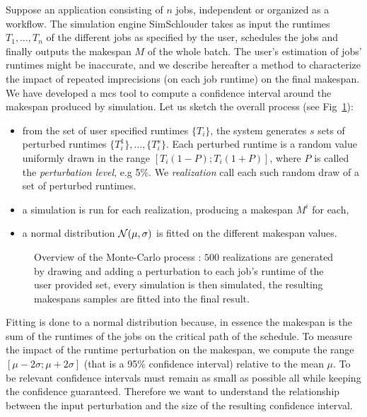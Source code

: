 \documentclass[10pt,conference,compsocconf]{IEEEtran}
\begin{document}
Suppose an  application consisting of  $n$ jobs,  independent or organized  as a
workflow.   The  simulation engine  SimSchlouder  takes  as input  the  runtimes
$T_1, \ldots ,  T_n$ of the different  jobs as specified by  the user, schedules
the jobs and  finally outputs the makespan  $M$ of the whole  batch.  The user's
estimation of  jobs' runtimes might be  inaccurate, and we describe  hereafter a
method to characterize the impact of repeated imprecisions (on each job runtime)
on the  final makespan.  We  have developed a \ac{mcs}  tool to compute a
confidence interval around the makespan produced   by   simulation.   Let   us
sketch   the   overall   process   (see Fig~\ref{fig:mc-process}):
\begin{itemize} 
\item from  the set of user  specified runtimes $\{T_i\}$, the  system generates
  $s$ sets of perturbed runtimes  $\{T_i^1\}, \ldots, \{T_i^s\}$. Each perturbed
  runtime    is   a    random   value    uniformly   drawn    in   the    range
  $[T_i (1-P); T_i  (1+P)]$, where $P$ is called  the \emph{perturbation level},
  e.g  5\%.  We \emph{realization}  call  each  such random  draw  of  a set  of
  perturbed runtimes.
\item a simulation  is run for each realization, producing  a makespan $M^i$ for
  each,
\item  a  normal  distribution  ${\cal N}(\mu,\sigma)$  is  fitted  on
		the different  makespan values.
\end{itemize}
\begin{figure}
	\centering
	\resizebox{0.5\textwidth}{!}{%
		
		}
                \caption{Overview   of   the   Monte-Carlo   process   :   $500$
                  realizations   are  generated   by   drawing   and  adding   a
                  perturbation to each  job's runtime of the  user provided set,
                  every simulation  is then  simulated, the  resulting makespans
		  samples are fitted into the final result. \label{fig:mcprocess}
		  }
      \label{fig:mc-process}
\end{figure}
Fitting is done to a normal distribution because, in essence the makespan is the
sum  of the  runtimes of  the jobs  on the  critical path  of the  schedule.  To
measure the impact  of the runtime perturbation on the  makespan, we compute the
range $[\mu-2\sigma;\mu+2\sigma]$ (that is  a 95\% confidence interval) relative
to  the mean  $\mu$. 
To be relevant confidence intervals must remain as small as possible all while
keeping the confidence guaranteed. Therefore we want to understand the relationship
between the input perturbation and the size of the resulting confidence interval.
\end{document}

